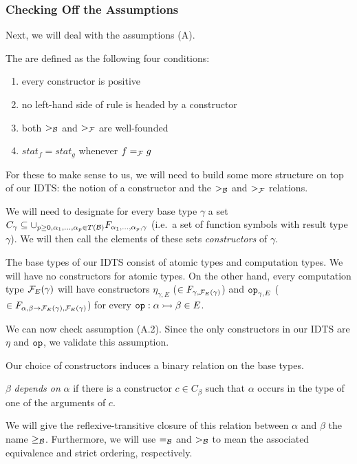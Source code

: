 \subsubsection{Checking Off the Assumptions}

Next, we will deal with the assumptions (A).

\begin{definition}
  The  are defined as the following four conditions:
  \begin{enumerate}
  \item every constructor is positive
  \item no left-hand side of rule is headed by a constructor
  \item both $>_{\mathcal{B}}$ and $>_{\mathcal{F}}$ are well-founded
  \item $stat_f = stat_g$ whenever $f =_{\mathcal{F}} g$
  \end{enumerate}
\end{definition}

For these to make sense to us, we will need to build some more structure on
top of our IDTS: the notion of a constructor and the $>_{\mathcal{B}}$ and $>_{\mathcal{F}}$
relations.

We will need to designate for every base type $\gamma$ a set
$C_\gamma \subseteq \cup_{p \ge 0, \alpha_1, \ldots, \alpha_p \in T(\mathcal{B})}
F_{\alpha_1, \ldots, \alpha_p, \gamma}$ (i.e.\ a set of function symbols
with result type $\gamma$). We will then call the elements of these sets
\emph{constructors} of $\gamma$.

The base types of our IDTS consist of atomic types and computation
types. We will have no constructors for atomic types. On the other hand,
every computation type $\mathcal{F}_E(\gamma)$ will have constructors
$\eta_{\gamma,E}$ ($\in F_{\gamma,\mathcal{F}_E(\gamma)}$) and $\mathtt{op}_{\gamma,E}$
($\in F_{\alpha,\beta \to \mathcal{F}_E(\gamma),\mathcal{F}_E(\gamma)}$) for every
$\mathtt{op} : \alpha \rightarrowtail \beta \in E$.

We can now check assumption (A.2). Since the only constructors in our IDTS
are $\eta$ and $\mathtt{op}$, we validate this assumption.

Our choice of constructors induces a binary relation on the base types.

\begin{definition}
  $\beta$ \emph{depends on} $\alpha$ if there is a constructor
  $c \in C_\beta$ such that $\alpha$ occurs in the type of one of the
  arguments of $c$.
  
  We will give the reflexive-transitive closure of this relation between
  $\alpha$ and $\beta$ the name $\ge_{\mathcal{B}}$. Furthermore, we will use $=_{\mathcal{B}}$
  and $>_{\mathcal{B}}$ to mean the associated equivalence and strict ordering,
  respectively.
\end{definition}

